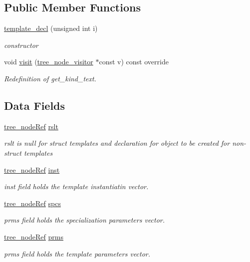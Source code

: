 \subsection*{Public Member Functions}
\begin{DoxyCompactItemize}
\item 
\hyperlink{structtemplate__decl_affa717d13d5eb3d7105f9e41fd5104d9}{template\+\_\+decl} (unsigned int i)
\begin{DoxyCompactList}\small\item\em constructor \end{DoxyCompactList}\item 
void \hyperlink{structtemplate__decl_a38f7c267485cd3aaefda2f7f49132af1}{visit} (\hyperlink{classtree__node__visitor}{tree\+\_\+node\+\_\+visitor} $\ast$const v) const override
\begin{DoxyCompactList}\small\item\em Redefinition of get\+\_\+kind\+\_\+text. \end{DoxyCompactList}\end{DoxyCompactItemize}
\subsection*{Data Fields}
\begin{DoxyCompactItemize}
\item 
\hyperlink{tree__node_8hpp_a6ee377554d1c4871ad66a337eaa67fd5}{tree\+\_\+node\+Ref} \hyperlink{structtemplate__decl_acecaebf7c65aed34842145e2bf1fccde}{rslt}
\begin{DoxyCompactList}\small\item\em rslt is null for struct templates and declaration for object to be created for non-\/struct templates \end{DoxyCompactList}\item 
\hyperlink{tree__node_8hpp_a6ee377554d1c4871ad66a337eaa67fd5}{tree\+\_\+node\+Ref} \hyperlink{structtemplate__decl_ac96f3534bdae1b9d21603be55210024e}{inst}
\begin{DoxyCompactList}\small\item\em inst field holds the template instantiatin vector. \end{DoxyCompactList}\item 
\hyperlink{tree__node_8hpp_a6ee377554d1c4871ad66a337eaa67fd5}{tree\+\_\+node\+Ref} \hyperlink{structtemplate__decl_a36780d7c998921187dd07c55f19d6f28}{spcs}
\begin{DoxyCompactList}\small\item\em prms field holds the specialization parameters vector. \end{DoxyCompactList}\item 
\hyperlink{tree__node_8hpp_a6ee377554d1c4871ad66a337eaa67fd5}{tree\+\_\+node\+Ref} \hyperlink{structtemplate__decl_aa8e7937b3112c96c9523096d517bace2}{prms}
\begin{DoxyCompactList}\small\item\em prms field holds the template parameters vector. \end{DoxyCompactList}\end{DoxyCompactItemize}
